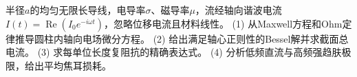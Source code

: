 半径\(a\)的均匀无限长导线，电导率\(\sigma\)、磁导率\(\mu\)，流经轴向谐波电流\(I(t)=\operatorname{Re}(I_0e^{-i\omega t})\)，忽略位移电流且材料线性。
(1) 从Maxwell方程和Ohm定律推导圆柱内轴向电场微分方程。
(2) 给出满足轴心正则性的Bessel解并求截面总电流。
(3) 求每单位长度复阻抗的精确表达式。
(4) 分析低频直流与高频强趋肤极限，给出平均焦耳损耗。

